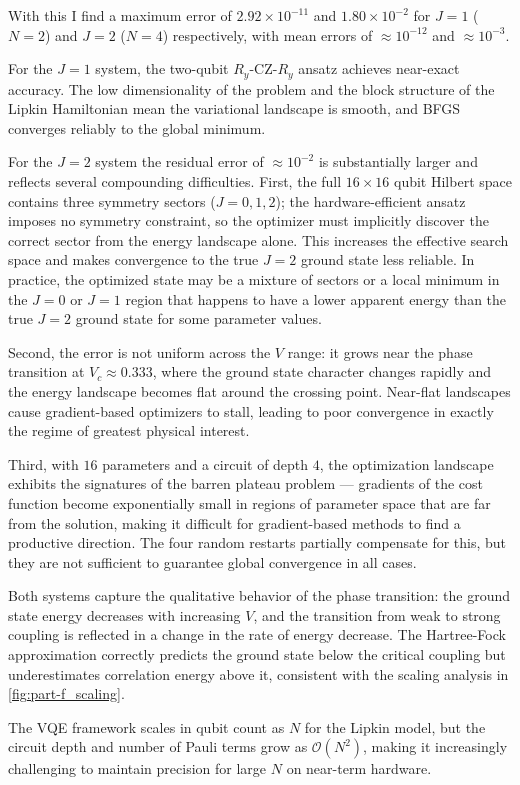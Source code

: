 With this I find a maximum error of $2.92\times10^{-11}$ and $1.80\times10^{-2}$ for $J=1$ ($N=2$) and $J=2$ ($N=4$) respectively, with mean errors of $\approx10^{-12}$ and $\approx10^{-3}$.

For the $J=1$ system, the two-qubit $R_y$-CZ-$R_y$ ansatz achieves near-exact accuracy. The low dimensionality of the problem and the block structure of the Lipkin Hamiltonian mean the variational landscape is smooth, and BFGS converges reliably to the global minimum.

For the $J=2$ system the residual error of $\approx10^{-2}$ is substantially larger and reflects several compounding difficulties. First, the full $16\times16$ qubit Hilbert space contains three symmetry sectors ($J=0,1,2$); the hardware-efficient ansatz imposes no symmetry constraint, so the optimizer must implicitly discover the correct sector from the energy landscape alone. This increases the effective search space and makes convergence to the true $J=2$ ground state less reliable. In practice, the optimized state may be a mixture of sectors or a local minimum in the $J=0$ or $J=1$ region that happens to have a lower apparent energy than the true $J=2$ ground state for some parameter values.

Second, the error is not uniform across the $V$ range: it grows near the phase transition at $V_c\approx0.333$, where the ground state character changes rapidly and the energy landscape becomes flat around the crossing point. Near-flat landscapes cause gradient-based optimizers to stall, leading to poor convergence in exactly the regime of greatest physical interest.

Third, with $16$ parameters and a circuit of depth $4$, the optimization landscape exhibits the signatures of the barren plateau problem \parencite{mcclean2018barren} — gradients of the cost function become exponentially small in regions of parameter space that are far from the solution, making it difficult for gradient-based methods to find a productive direction. The four random restarts partially compensate for this, but they are not sufficient to guarantee global convergence in all cases.

Both systems capture the qualitative behavior of the phase transition: the ground state energy decreases with increasing $V$, and the transition from weak to strong coupling is reflected in a change in the rate of energy decrease. The Hartree-Fock approximation correctly predicts the ground state below the critical coupling but underestimates correlation energy above it, consistent with the scaling analysis in \cref{fig:part-f_scaling}.

The VQE framework scales in qubit count as $N$ for the Lipkin model, but the circuit depth and number of Pauli terms grow as $\mathcal{O}(N^2)$, making it increasingly challenging to maintain precision for large $N$ on near-term hardware.

